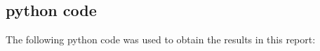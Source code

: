 \documentclass[11pt,letterpaper]{article}
\begin{document}
\subsection{python code}

The following python code was used to obtain the results in this report:










\end{document}
